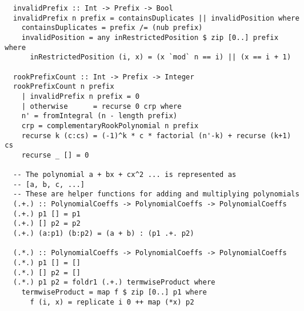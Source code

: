 \begin{verbatim}
  invalidPrefix :: Int -> Prefix -> Bool
  invalidPrefix n prefix = containsDuplicates || invalidPosition where
    containsDuplicates = prefix /= (nub prefix)
    invalidPosition = any inRestrictedPosition $ zip [0..] prefix where
      inRestrictedPosition (i, x) = (x `mod` n == i) || (x == i + 1)

  rookPrefixCount :: Int -> Prefix -> Integer
  rookPrefixCount n prefix
    | invalidPrefix n prefix = 0
    | otherwise      = recurse 0 crp where
    n' = fromIntegral (n - length prefix)
    crp = complementaryRookPolynomial n prefix
    recurse k (c:cs) = (-1)^k * c * factorial (n'-k) + recurse (k+1) cs
    recurse _ [] = 0

  -- The polynomial a + bx + cx^2 ... is represented as
  -- [a, b, c, ...]
  -- These are helper functions for adding and multiplying polynomials
  (.+.) :: PolynomialCoeffs -> PolynomialCoeffs -> PolynomialCoeffs
  (.+.) p1 [] = p1
  (.+.) [] p2 = p2
  (.+.) (a:p1) (b:p2) = (a + b) : (p1 .+. p2)

  (.*.) :: PolynomialCoeffs -> PolynomialCoeffs -> PolynomialCoeffs
  (.*.) p1 [] = []
  (.*.) [] p2 = []
  (.*.) p1 p2 = foldr1 (.+.) termwiseProduct where
    termwiseProduct = map f $ zip [0..] p1 where
      f (i, x) = replicate i 0 ++ map (*x) p2
\end{verbatim}
